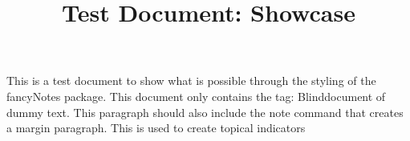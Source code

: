 \documentclass{article}
\title{Test Document: Showcase}
\begin{document}
\blindmathtrue
This is a test document to show what is possible through the styling of the fancyNotes package. This document only contains the tag: Blinddocument of dummy text. This paragraph should also include the note command that creates a margin paragraph. This is used to create topical indicators\Blinddocument
\end{document}
